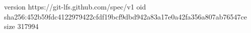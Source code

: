 version https://git-lfs.github.com/spec/v1
oid sha256:452b59fdc4122979422cfdf19bcf9dbd942a83a17e0a42fa356a807ab76547ce
size 317994
